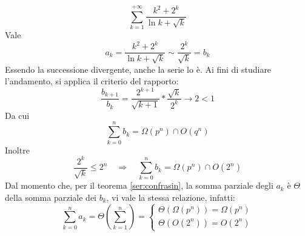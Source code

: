 \begin{examp}
	\[
		\sum_{k=1}^{+\infty} \frac{k^2+2^k}{\ln k +\sqrt k}
	\]
	Vale
	\[
		a_k=\frac{k^2+2^k}{\ln k +\sqrt k}\sim \frac{2^k}{\sqrt k}=b_k
	\]
	Essendo la successione divergente, anche la serie lo è. Ai fini di studiare l'andamento, si applica il criterio del rapporto:
	\[
		\frac{b_{k+1}}{b_k}=\frac{2^{k+1}}{\sqrt{k+1}}*\frac{\sqrt k}{2^k}\to 2<1
	\]
	Da cui
	\[
		\sum_{k=0}^n b_k=\Omega(p^n)\cap O(q^n)
	\]
	Inoltre
	\[
		\frac{2^k}{\sqrt k}\leq 2^n\quad\Rightarrow\quad \sum_{k=0}^n b_k=\Omega(p^n)\cap O(2^n)
	\]
	Dal momento che, per il teorema \ref{ser:confrasin}, la somma parziale degli $a_k$ è $\Theta$ della somma parziale dei $b_k$, vi vale la stessa relazione, infatti:
	\[
		\sum_{k=0}^n a_k = \Theta\left(\sum_{k=1}^n\right)=
		\begin{cases}
			\Theta(\Omega(p^n))=\Omega(p^n) \\
			\Theta(O(2^n))=O(2^n)
		\end{cases}
	\]
\end{examp}

